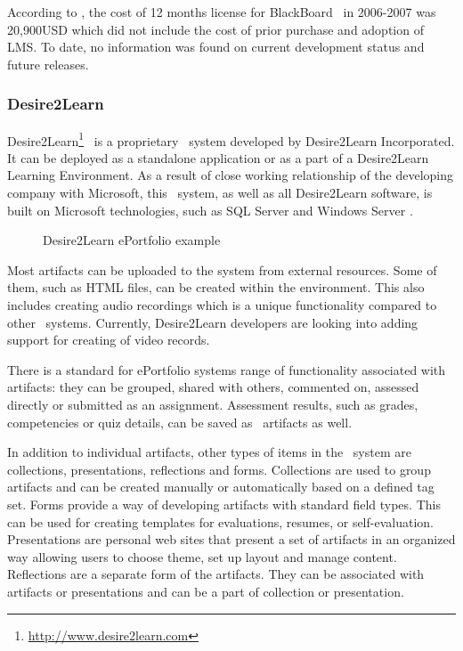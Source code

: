 According to \citet{Sweat-Guy2007}, the cost of 12 months license for
BlackBoard \ep~in 2006-2007 was 20,900USD which did not include the cost of
prior purchase and adoption of LMS. To date, no information was found on current
development status and future releases.

\subsubsection{Desire2Learn}
Desire2Learn\footnote{\url{http://www.desire2learn.com}} \ep~is a proprietary
\ep~system developed by Desire2Learn Incorporated. It can be deployed as a
standalone application or as a part of a Desire2Learn Learning Environment. As a
result of close working relationship of the developing company with Microsoft,
this \ep~system, as well as all Desire2Learn software, is built on Microsoft
technologies, such as SQL Server and Windows Server \citep{AAEEBL2011a}.

\begin{figure}[htb]
\centering
\setlength\fboxsep{0pt}
\setlength\fboxrule{0.5pt}
\fbox{\texttt{[image: CH4-F7-D2L]}}
\caption[Desire2Learn ePortfolio example]{Desire2Learn ePortfolio example
\citep{Desire2LearnIncorporated2011}}
\label{fig:d2ep} 
\end{figure}

Most artifacts can be uploaded to the system from external resources. Some of
them, such as HTML files, can be created within the environment. This also
includes creating audio recordings which is a unique functionality compared to
other \ep~systems. Currently, Desire2Learn developers are looking into adding
support for creating of video records.

There is a standard for ePortfolio systems range of functionality associated
with artifacts: they can be grouped, shared with others, commented on, assessed
directly or submitted as an assignment. Assessment results, such as grades,
competencies or quiz details, can be saved as \ep~artifacts as well.

In addition to individual artifacts, other types of items in the \ep~system are
collections, presentations, reflections and forms. Collections are used to group
artifacts and can be created manually or automatically based on a defined tag
set. Forms provide a way of developing artifacts with standard field types. This
can be used for creating templates for evaluations, resumes, or self-evaluation.
Presentations are personal web sites that present a set of artifacts in an
organized way allowing users to choose theme, set up layout and manage content.
Reflections are a separate form of the artifacts. They can be associated with
artifacts or presentations and can be a part of collection or presentation.

